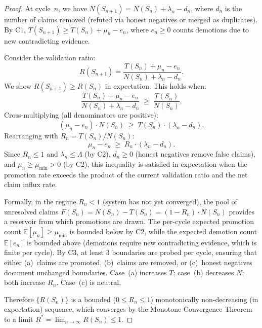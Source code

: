 \documentclass[11pt]{article}
\theoremstyle{definition}
\theoremstyle{remark}
\begin{document}
\begin{proof}
At cycle~$n$, we have $N(S_{n+1}) = N(S_n) + \lambda_n - d_n$, where $d_n$
is the number of claims removed (refuted via honest negatives or merged as
duplicates).  By C1, $T(S_{n+1}) \geq T(S_n) + \mu_n - e_n$, where
$e_n \geq 0$ counts demotions due to new contradicting evidence.

Consider the validation ratio:
\begin{equation}
  \label{eq:ratio-update}
  R(S_{n+1}) = \frac{T(S_n) + \mu_n - e_n}{N(S_n) + \lambda_n - d_n}.
\end{equation}
We show $R(S_{n+1}) \geq R(S_n)$ in expectation.  This holds when:
\begin{equation}
  \label{eq:ratio-condition}
  \frac{T(S_n) + \mu_n - e_n}{N(S_n) + \lambda_n - d_n}
  \;\geq\; \frac{T(S_n)}{N(S_n)}.
\end{equation}
Cross-multiplying (all denominators are positive):
\begin{equation}
  \label{eq:cross-multiply}
  (\mu_n - e_n) \cdot N(S_n)
  \;\geq\;
  T(S_n) \cdot (\lambda_n - d_n).
\end{equation}
Rearranging with $R_n = T(S_n)/N(S_n)$:
\begin{equation}
  \label{eq:rearranged}
  \mu_n - e_n \;\geq\; R_n \cdot (\lambda_n - d_n).
\end{equation}
Since $R_n \leq 1$ and $\lambda_n \leq \Lambda$ (by C2), $d_n \geq 0$ (honest
negatives remove false claims), and $\mu_n \geq \mu_{\min} > 0$ (by C2), this
inequality is satisfied in expectation when the promotion rate exceeds the
product of the current validation ratio and the net claim influx rate.

Formally, in the regime $R_n < 1$ (system has not yet converged), the pool of
unresolved claims $F(S_n) = N(S_n) - T(S_n) = (1 - R_n) \cdot N(S_n)$ provides
a reservoir from which promotions are drawn.  The per-cycle expected promotion
count $\mathbb{E}[\mu_n] \geq \mu_{\min}$ is bounded below by C2, while the
expected demotion count $\mathbb{E}[e_n]$ is bounded above (demotions require
new contradicting evidence, which is finite per cycle).  By C3, at least 3
boundaries are probed per cycle, ensuring that either (a)~claims are promoted,
(b)~claims are removed, or (c)~honest negatives document unchanged boundaries.
Case~(a) increases $T$; case~(b) decreases $N$; both increase $R_n$.
Case~(c) is neutral.

Therefore $\{R(S_n)\}$ is a bounded ($0 \leq R_n \leq 1$) monotonically
non-decreasing (in expectation) sequence, which converges by the Monotone
Convergence Theorem to a limit $R^* = \lim_{n \to \infty} R(S_n) \leq 1$.
\end{proof}
\end{document}
